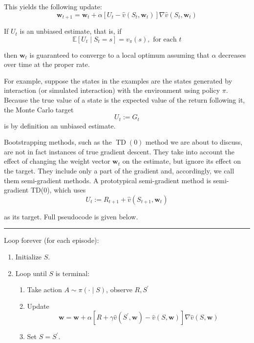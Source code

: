 \documentclass[11pt]{article}
\theoremstyle{plain} %
\theoremstyle{remark}
\begin{document}
 This yields the following update:
$$
\boldsymbol{w}_{t+1}=\boldsymbol{w}_{t}+\alpha\left[U_{t}-\hat{v}\left(S_{t}, \boldsymbol{w}_{t}\right)\right] \nabla \hat{v}\left(S_{t}, \boldsymbol{w}_{t}\right)
$$

If $U_{t}$ is an unbiased estimate, that is, if
$$
\mathbb{E}\left[U_{t} \mid S_{t}=s\right]=v_{\pi}(s), \text { for each } t
$$

then $\boldsymbol{w}_{t}$ is guaranteed to converge to a local optimum assuming
that $\alpha$ decreases over time at the proper rate.

 For example, suppose the states in the examples are the states generated
  by interaction (or simulated interaction) with the environment using policy
  $\pi$. Because the true value of a state is the expected value of the return
  following it, the Monte Carlo target
$$
U_{t}:=G_{t}
$$
is by definition an unbiased estimate.

 Bootstrapping methods, such as the $\operatorname{TD}(0)$ method we are
  about to discuss, are not in fact instances of true gradient descent. They take into account the effect of changing the weight vector
  $\boldsymbol{w}_{t}$ on the estimate, but ignore its effect on the target. They include only a part of the gradient and, accordingly, we call them
  semi-gradient methods. A prototypical semi-gradient method is semi-gradient TD(0), which uses
$$
U_{t}:=R_{t+1}+\hat{v}\left(S_{t+1}, \boldsymbol{w}_{t}\right)
$$

as its target. Full pseudocode is given below.

\vspace*{0.65em}
\hrule

Loop forever (for each episode):
            \begin{enumerate}[label=(\arabic*)]
              \item Initialize $S$.
              \item Loop until $S$ is terminal:
                \begin{enumerate}[label=(\arabic*)]
                  \item Take action $A \sim \pi(\cdot \mid S)$, observe $R, S^{\prime}$
                  \item Update
                  $$
                  \boldsymbol{w}=\boldsymbol{w}+\alpha\left[R+\gamma \hat{v}\left(S^{\prime}, \boldsymbol{w}\right)-\hat{v}(S, \boldsymbol{w})\right] \nabla \hat{v}(S, \boldsymbol{w})
                  $$
                  \item Set $S=S^{\prime}$.
                \end{enumerate}
              \end{enumerate}
\end{document}
